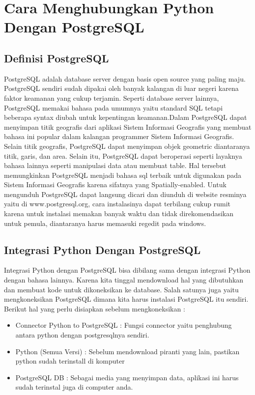 \section{Cara Menghubungkan Python Dengan PostgreSQL}

\subsection{Definisi PostgreSQL}
\cite{momjian2001postgresql}PostgreSQL adalah database server dengan basis open source yang paling maju. PostgreSQL sendiri sudah dipakai oleh banyak kalangan di luar negeri karena faktor keamanan yang cukup terjamin. Seperti database server lainnya, PostgreSQL memakai bahasa pada umumnya yaitu standard SQL tetapi beberapa syntax diubah untuk kepentingan keamanan.Dalam PostgreSQL dapat menyimpan titik geografis dari aplikasi Sistem Informasi Geografis yang membuat bahasa ini popular dalam kalangan programmer Sistem Informasi Geografis. Selain titik geografis, PostgreSQL dapat menyimpan objek geometric diantaranya titik, garis, dan area. Selain itu, PostgreSQL dapat beroperasi seperti layaknya bahasa lainnya seperti manipulasi data atau membuat table. Hal tersebut memungkinkan PostgreSQL menjadi bahasa sql terbaik untuk digunakan pada Sistem Informasi Geografis karena sifatnya yang Spatially-enabled. Untuk mengunduh PostgreSQL dapat langsung dicari dan diunduh di website resminya yaitu di www.postgresql.org, cara instalasinya dapat terbilang cukup rumit karena untuk instalasi memakan banyak waktu dan tidak direkomendasikan untuk pemula, diantaranya harus memasuki regedit pada windows. 

\subsection{Integrasi Python Dengan PostgreSQL} 
Integrasi Python dengan PostgreSQL bisa dibilang sama dengan integrasi Python dengan bahasa lainnya.  Karena kita tinggal mendownload hal yang dibutuhkan dan membuat kode untuk dikoneksikan ke database. Salah satunya juga yaitu mengkoneksikan PostgreSQL dimana kita harus instalasi PostgreSQL itu sendiri. Berikut hal yang perlu disiapkan sebelum mengkoneksikan : 
\begin{itemize}
\item Connector Python to PostgreSQL : Fungsi connector yaitu penghubung antara python dengan postgresqlnya sendiri. 
\item Python (Semua Versi) : Sebelum mendownload piranti yang lain, pastikan python sudah terinstall di komputer
\item PostgreSQL DB : Sebagai media yang menyimpan data, aplikasi ini harus sudah terinstal juga di computer anda.
\end{itemize}



